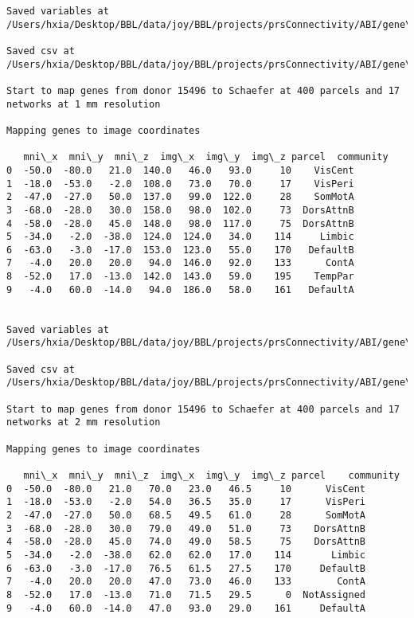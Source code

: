 \documentclass[11pt]{article}
\begin{document}
\begin{Verbatim}[commandchars=\\\{\}]
Saved variables at /Users/hxia/Desktop/BBL/data/joy/BBL/projects/prsConnectivity/ABI/gene\_mapping/15496donor\_400Parcels\_7Network\_2mm.pkl

Saved csv at /Users/hxia/Desktop/BBL/data/joy/BBL/projects/prsConnectivity/ABI/gene\_mapping/15496donor\_400Parcels\_7Network\_2mm.csv

Start to map genes from donor 15496 to Schaefer at 400 parcels and 17 networks at 1 mm resolution

Mapping genes to image coordinates

   mni\_x  mni\_y  mni\_z  img\_x  img\_y  img\_z parcel  community
0  -50.0  -80.0   21.0  140.0   46.0   93.0     10    VisCent
1  -18.0  -53.0   -2.0  108.0   73.0   70.0     17    VisPeri
2  -47.0  -27.0   50.0  137.0   99.0  122.0     28    SomMotA
3  -68.0  -28.0   30.0  158.0   98.0  102.0     73  DorsAttnB
4  -58.0  -28.0   45.0  148.0   98.0  117.0     75  DorsAttnB
5  -34.0   -2.0  -38.0  124.0  124.0   34.0    114     Limbic
6  -63.0   -3.0  -17.0  153.0  123.0   55.0    170   DefaultB
7   -4.0   20.0   20.0   94.0  146.0   92.0    133      ContA
8  -52.0   17.0  -13.0  142.0  143.0   59.0    195    TempPar
9   -4.0   60.0  -14.0   94.0  186.0   58.0    161   DefaultA


Saved variables at /Users/hxia/Desktop/BBL/data/joy/BBL/projects/prsConnectivity/ABI/gene\_mapping/15496donor\_400Parcels\_17Network\_1mm.pkl

Saved csv at /Users/hxia/Desktop/BBL/data/joy/BBL/projects/prsConnectivity/ABI/gene\_mapping/15496donor\_400Parcels\_17Network\_1mm.csv

Start to map genes from donor 15496 to Schaefer at 400 parcels and 17 networks at 2 mm resolution

Mapping genes to image coordinates

   mni\_x  mni\_y  mni\_z  img\_x  img\_y  img\_z parcel    community
0  -50.0  -80.0   21.0   70.0   23.0   46.5     10      VisCent
1  -18.0  -53.0   -2.0   54.0   36.5   35.0     17      VisPeri
2  -47.0  -27.0   50.0   68.5   49.5   61.0     28      SomMotA
3  -68.0  -28.0   30.0   79.0   49.0   51.0     73    DorsAttnB
4  -58.0  -28.0   45.0   74.0   49.0   58.5     75    DorsAttnB
5  -34.0   -2.0  -38.0   62.0   62.0   17.0    114       Limbic
6  -63.0   -3.0  -17.0   76.5   61.5   27.5    170     DefaultB
7   -4.0   20.0   20.0   47.0   73.0   46.0    133        ContA
8  -52.0   17.0  -13.0   71.0   71.5   29.5      0  NotAssigned
9   -4.0   60.0  -14.0   47.0   93.0   29.0    161     DefaultA



\end{Verbatim}
\end{document}
